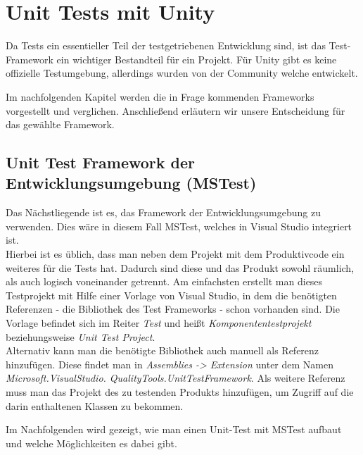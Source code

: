 \chapter{Unit Tests mit Unity}

Da Tests ein essentieller Teil der testgetriebenen Entwicklung sind, ist das Test-Framework ein wichtiger Bestandteil für ein Projekt. Für Unity gibt es keine offizielle Testumgebung, allerdings wurden von der Community welche entwickelt.

Im nachfolgenden Kapitel werden die in Frage kommenden Frameworks vorgestellt und verglichen. Anschließend erläutern wir unsere Entscheidung für das gewählte Framework.

\section{Unit Test Framework der Entwicklungsumgebung (MSTest)}

Das Nächstliegende ist es, das Framework der Entwicklungsumgebung zu verwenden. Dies wäre in diesem Fall MSTest, welches in Visual Studio integriert ist.\\
Hierbei ist es üblich, dass man neben dem Projekt mit dem Produktivcode ein weiteres für die Tests hat. Dadurch sind diese und das Produkt sowohl räumlich, als auch logisch voneinander getrennt. Am einfachsten erstellt man dieses Testprojekt mit Hilfe einer Vorlage von Visual Studio, in dem die benötigten Referenzen - die Bibliothek des Test Frameworks - schon vorhanden sind. Die Vorlage befindet sich im Reiter \textit{Test} und heißt \textit{Komponententestprojekt} beziehungsweise \textit{Unit Test Project}.\\
Alternativ kann man die benötigte Bibliothek auch manuell als Referenz hinzufügen. Diese findet man in \textit{Assemblies -> Extension} unter dem Namen \textit{Microsoft.VisualStudio. QualityTools.UnitTestFramework}. Als weitere Referenz muss man das Projekt des zu testenden Produkts hinzufügen, um Zugriff auf die darin enthaltenen Klassen zu bekommen.

Im Nachfolgenden wird gezeigt, wie man einen Unit-Test mit MSTest aufbaut und welche Möglichkeiten es dabei gibt.

